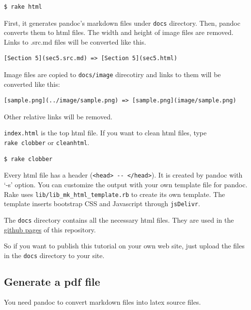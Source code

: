 \begin{verbatim}
$ rake html
\end{verbatim}

First, it generates pandoc's markdown files under \texttt{docs}
directory. Then, pandoc converts them to html files. The width and
height of image files are removed. Links to .src.md files will be
converted like this.

\begin{verbatim}
[Section 5](sec5.src.md) => [Section 5](sec5.html)
\end{verbatim}

Image files are copied to \texttt{docs/image} direcotiry and links to
them will be converted like this:

\begin{verbatim}
[sample.png](../image/sample.png) => [sample.png](image/sample.png)
\end{verbatim}

Other relative links will be removed.

\texttt{index.html} is the top html file. If you want to clean html
files, type \texttt{rake\ clobber} or \texttt{cleanhtml}.

\begin{verbatim}
$ rake clobber
\end{verbatim}

Every html file has a header
(\texttt{\textless{}head\textgreater{}\ -\/-\ \textless{}/head\textgreater{}}).
It is created by pandoc with `-s' option. You can customize the output
with your own template file for pandoc. Rake uses
\texttt{lib/lib\_mk\_html\_template.rb} to create its own template. The
template inserts bootstrap CSS and Javascript through \texttt{jsDelivr}.

The \texttt{docs} directory contains all the necessary html files. They
are used in the \href{https://ToshioCP.github.io/Gtk4-tutorial}{github
pages} of this repository.

So if you want to publish this tutorial on your own web site, just
upload the files in the \texttt{docs} directory to your site.

\hypertarget{generate-a-pdf-file}{%
\subsection{Generate a pdf file}\label{generate-a-pdf-file}}

You need pandoc to convert markdown files into latex source files.

